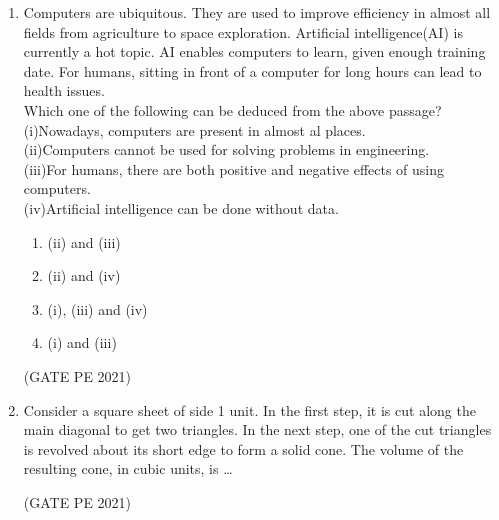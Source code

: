 \documentclass[journal,12pt,onecolumn]{IEEEtran}
\theoremstyle{remark}
\begin{document}
\begin{enumerate}
\item Computers are ubiquitous. They are used to improve efficiency in almost all fields from agriculture to space exploration. Artificial intelligence(AI) is currently a hot topic. AI enables computers to learn, given enough training date. For humans, sitting in front of a computer for long hours can lead to health issues.\\
Which one of the following can be deduced from the above passage?\\
(i)Nowadays, computers are present in almost al places.\\
(ii)Computers cannot be used for solving problems in engineering.\\
(iii)For humans, there are both positive and negative effects of using computers.\\
(iv)Artificial intelligence can be done without data.
\begin{enumerate}
    \item (ii) and (iii)
    \item (ii) and (iv)
    \item (i), (iii) and (iv)
    \item (i) and (iii)
\end{enumerate}
\hfill{(GATE PE 2021)}

\item Consider a square sheet of side 1 unit. In the first step, it is cut along the main diagonal to get two triangles. In the next step, one of the cut triangles is revolved about its short edge to form a solid cone. The volume of the resulting cone, in cubic units, is \dots
\begin{enumerate}
\end{enumerate}
\hfill{(GATE PE 2021)}


\end{enumerate}
\end{document}
